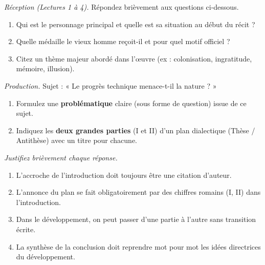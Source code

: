 \documentclass[11pt]{article}
\begin{document}
\begin{exercice}
\emph{Réception (Lectures 1 à 4).} Répondez brièvement aux questions ci-dessous.
\begin{enumerate}
    \item Qui est le personnage principal et quelle est sa situation au début du récit ?
    \item Quelle médaille le vieux homme reçoit-il et pour quel motif officiel ?
    \item Citez un thème majeur abordé dans l'œuvre (ex : colonisation, ingratitude, mémoire, illusion).
\end{enumerate}
\end{exercice}

\begin{exercice}
\emph{Production.} Sujet : « Le progrès technique menace-t-il la nature ? »
\begin{enumerate}
    \item Formulez une \textbf{problématique} claire (sous forme de question) issue de ce sujet.
    \item Indiquez les \textbf{deux grandes parties} (I et II) d'un plan dialectique (Thèse / Antithèse) avec un titre pour chacune.
\end{enumerate}
\end{exercice}

\begin{exercice}
\emph{Justifiez brièvement chaque réponse.}
\begin{enumerate}
    \item L'accroche de l'introduction doit toujours être une citation d'auteur.
    \item L'annonce du plan se fait obligatoirement par des chiffres romains (I, II) dans l'introduction.
    \item Dans le développement, on peut passer d'une partie à l'autre sans transition écrite.
    \item La synthèse de la conclusion doit reprendre mot pour mot les idées directrices du développement.
\end{enumerate}
\end{exercice}
\end{document}
